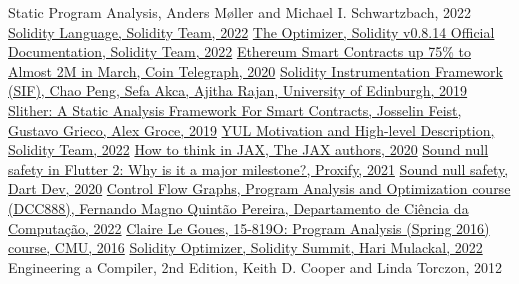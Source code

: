 
\begin{thebibliography}{9}
     {Static Program Analysis, Anders Møller and Michael I. Schwartzbach, 2022}
     \href{https://soliditylang.org/}{Solidity Language, Solidity Team, 2022}
     \href{https://docs.soliditylang.org/en/v0.8.14/internals/optimizer.html}{The Optimizer, Solidity v0.8.14 Official Documentation, Solidity Team, 2022}
     \href{https://cointelegraph.com/news/ethereum-smart-contracts-up-75-to-almost-2m-in-march}{Ethereum Smart Contracts up 75\% to Almost 2M in March, Coin Telegraph, 2020}
     \href{https://arxiv.org/pdf/1905.01659.pdf}{Solidity Instrumentation Framework (SIF), Chao Peng, Sefa Akca, Ajitha Rajan, University of Edinburgh, 2019}
     \href{https://arxiv.org/pdf/1908.09878.pdf}{Slither: A Static Analysis Framework For Smart Contracts, Josselin Feist, Gustavo Grieco, Alex Groce, 2019}
     \href{https://docs.soliditylang.org/en/v0.8.14/yul.html#motivation-and-high-level-description}{YUL Motivation and High-level Description, Solidity Team, 2022}
     \href{https://jax.readthedocs.io/en/latest/notebooks/thinking_in_jax.html#to-jit-or-not-to-jit}{How to think in JAX, The JAX authors, 2020}
     \href{https://proxify.io/articles/flutter-2-null-safety#what-is-sound-null-safety-anyways}{Sound null safety in Flutter 2: Why is it a major milestone?, Proxify, 2021}
     \href{https://dart.dev/null-safety}{Sound null safety, Dart Dev, 2020}
     \href{https://homepages.dcc.ufmg.br/~fernando/classes/dcc888/ementa/slides/ControlFlowGraphs.pdf}{Control Flow Graphs, Program Analysis and Optimization course (DCC888), Fernando Magno Quintão Pereira, Departamento de Ciência da Computação, 2022}
     \href{https://www.cs.cmu.edu/~clegoues/courses/15-819O-16sp/notes/notes04-dataflow-correctness.pdf}{Claire Le Goues, 15-819O: Program Analysis (Spring 2016) course, CMU, 2016}
     \href{https://hrkrshnn.com/t/devconnect.pdf}{Solidity Optimizer, Solidity Summit, Hari Mulackal, 2022}
     {Engineering a Compiler, 2nd Edition, Keith D. Cooper and Linda Torczon, 2012}
\end{thebibliography}